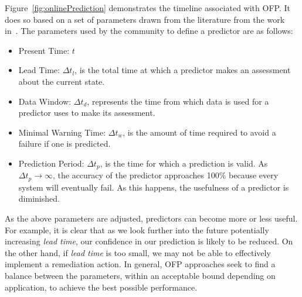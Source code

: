 \figonlinePrediction

Figure~\ref{fig:onlinePrediction} demonstrates the timeline associated with OFP.  It does so based on a set of parameters drawn from the literature from the work in~\cite{salfnerSurvey}.  The parameters used by the community to define a predictor are as follows:
\begin{itemize}
	\item{Present Time: $t$}
	\item{Lead Time: $\Delta t_{l}$, is the total time at which a predictor makes an assessment about the current state.}
	\item{Data Window: $\Delta t_{d}$, represents the time from which data is used for a predictor uses to make its assessment.}
	\item{Minimal Warning Time: $\Delta t_{w}$, is the amount of time required to avoid a failure if one is predicted.}
	\item{Prediction Period: $\Delta t_{p}$, is the time for which a prediction is valid.  As $\Delta t_{p} \rightarrow \infty$, the accuracy of the predictor approaches 100\% because every system will eventually fail.  As this happens, the usefulness of a predictor is diminished.}
\end{itemize}

As the above parameters are adjusted, predictors can become more or less useful.  For example, it is clear that as we look further into the future potentially increasing \emph{lead time}, our confidence in our prediction is likely to be reduced.  On the other hand, if \emph{lead time} is too small, we may not be able to effectively implement a remediation action.  In general, OFP approaches seek to find a balance between the parameters, within an acceptable bound depending on application, to achieve the best possible performance.
